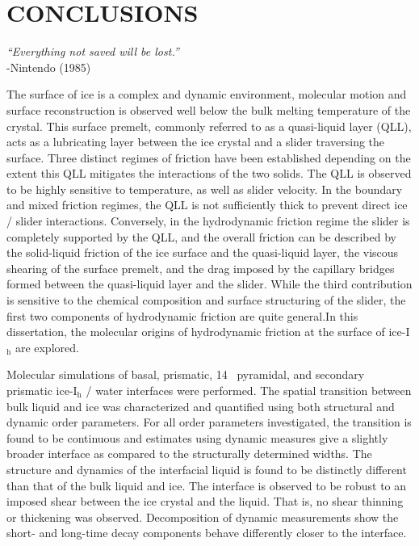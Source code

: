 \chapter{CONCLUSIONS}\label{chap:Concl}

\begin{flushright}
\textit{``Everything not saved will be lost.''} \\
-Nintendo (1985) \\
\end{flushright}

The surface of ice is a complex and dynamic environment, molecular
motion and surface reconstruction is observed well below the bulk
melting temperature of the crystal. This surface premelt, commonly
referred to as a quasi-liquid layer (QLL), acts as a lubricating layer
between the ice crystal and a slider traversing the surface.  Three
distinct regimes of friction have been established depending on the
extent this QLL mitigates the interactions of the two solids.  The QLL
is observed to be highly sensitive to temperature, as well as slider
velocity. In the boundary and mixed friction regimes, the QLL is not
sufficiently thick to prevent direct ice / slider
interactions. Conversely, in the hydrodynamic friction regime the
slider is completely supported by the QLL, and the overall friction
can be described by the solid-liquid friction of the ice surface and
the quasi-liquid layer, the viscous shearing of the surface premelt,
and the drag imposed by the capillary bridges formed between the
quasi-liquid layer and the slider. While the third contribution is
sensitive to the chemical composition and surface structuring of the
slider, the first two components of hydrodynamic friction are quite
general.In this dissertation, the molecular origins of hydrodynamic
friction at the surface of ice-I$_\mathrm{h}$ are explored.

Molecular simulations of basal, prismatic, 14\degree~ pyramidal, and
secondary prismatic ice-I$_\mathrm{h}$ / water interfaces were
performed. The spatial transition between bulk liquid and ice was
characterized and quantified using both structural and dynamic order
parameters. For all order parameters investigated, the transition is
found to be continuous and estimates using dynamic measures give a
slightly broader interface as compared to the structurally determined
widths. The structure and dynamics of the interfacial liquid is found
to be distinctly different than that of the bulk liquid and ice. The
interface is observed to be robust to an imposed shear between the ice
crystal and the liquid. That is, no shear thinning or thickening was
observed. Decomposition of dynamic measurements show the short- and
long-time decay components behave differently closer to the interface.


